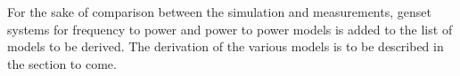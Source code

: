 For the sake of comparison between the simulation and measurements, genset systems for frequency to power and power to power models is added to the list of models to be derived. The derivation of the various models is to be described in the section to come. 























